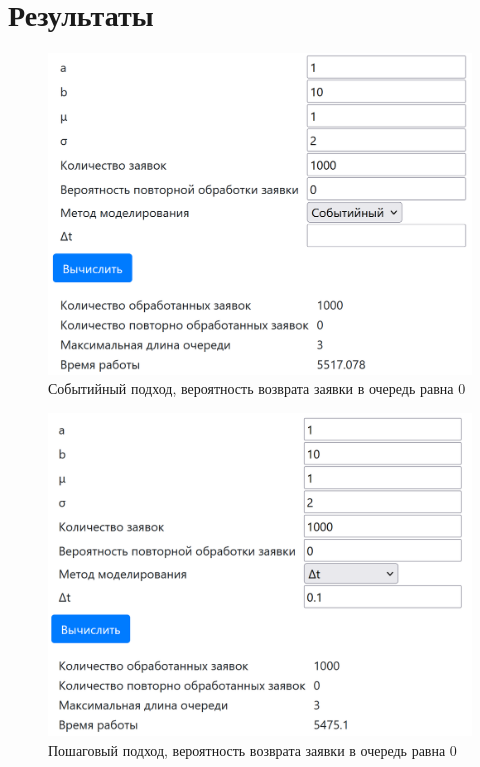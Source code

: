 \documentclass[a4paper, 12pt]{article}
\begin{document}
\section{{Результаты}}
\begin{figure}[h!]
	\centering \includegraphics[scale=0.7]{1}
	\centering\caption{Событийный подход, вероятность возврата заявки в очередь равна 0}
\end{figure}
\begin{figure}[h!]
	\centering \includegraphics[scale=0.7]{2}
	\centering\caption{Пошаговый подход, вероятность возврата заявки в очередь равна 0}
\end{figure}
\clearpage
\newpage
\end{document}

